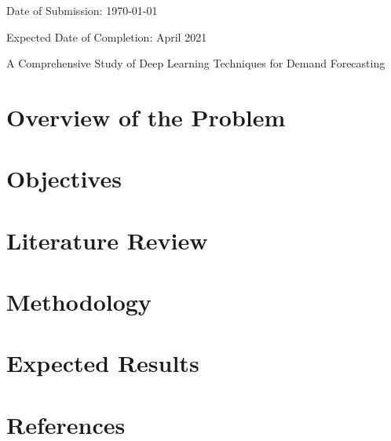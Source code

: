 \documentclass[fontsize=12pt,paper=a4]{scrartcl}
\newcommand{\tltle}{A Comprehensive Study of Deep Learning Techniques for Demand Forecasting}
\begin{document}
\begin{spacing}{1}
\begin{titlepage}
\begin{flushleft}
            \vspace{\baselineskip}
            Date of Submission: \today

            \vspace{\baselineskip}
            Expected Date of Completion: April 2021

        \end{flushleft}
    \end{titlepage}
\end{spacing}

\begin{center}
  \Large \tltle
\end{center}

\vspace{0.3in}
\noindent

\section{Overview of the Problem}
\begin{spacing}{1}
    
\end{spacing}

\section{Objectives}
\begin{spacing}{1}
    
\end{spacing}

\section{Literature Review}
\begin{spacing}{1}
    
\end{spacing}

\section{Methodology}
\begin{spacing}{1}
    
\end{spacing}

\section{Expected Results}
\begin{spacing}{1}
    
\end{spacing}


\section*{References}
\printbibliography
\end{document}
